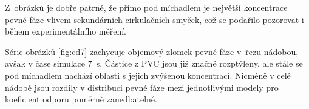 \newpage
\noindent Z~obrázků je dobře patrné, že přímo pod míchadlem je největší koncentrace pevné fáze vlivem sekundárních cirkulačních smyček, což se podařilo pozorovat i během experimentálního měření.

Série obrázků \ref{fig:cd7} zachycuje objemový zlomek pevné fáze v~řezu nádobou, avšak v čase simulace \SI{7}{\second}. Částice z PVC jsou již značně rozptýleny, ale stále se pod míchadlem nachází oblasti s jejich zvýšenou koncentrací. Nicméně v celé nádobě jsou rozdíly v distribuci pevné fáze mezi jednotlivými modely pro koeficient odporu poměrně zanedbatelné.

\begin{figure}[h!]
 \centering
  \qquad             

\end{figure}
